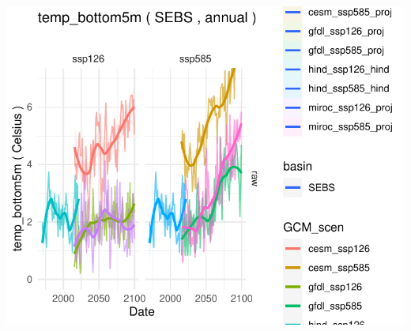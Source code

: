 \documentclass[
]{article}
\begin{document}
\begin{center}\includegraphics{ACLIM2_quickStart_files/figure-latex/unnamed-chunk-6-1} \end{center}
\end{document}
